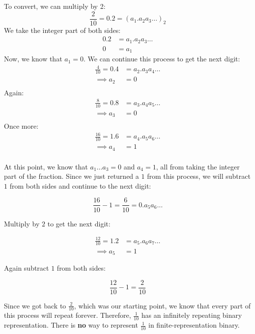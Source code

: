 To convert, we can multiply by 2:
\begin{equation*}
  \frac{2}{10} = 0.2 = (a_1 . a_2 a_3 \dots)_2
\end{equation*}
We take the integer part of both sides:
\begin{align*}
  0.2 &= a_1.a_2 a_3 \dots \\
  0 &= a_1
\end{align*}
Now, we know that $a_1 = 0$. We can continue this process to get the next
digit:
\begin{align*}
  \frac{4}{10} = 0.4 &= a_2.a_3 a_4 \dots \\
  \implies a_2 &= 0 \\
\end{align*}
Again:
\begin{align*}
  \frac{8}{10} = 0.8 &= a_3.a_4 a_5 \dots \\
  \implies a_3 &= 0 \\
\end{align*}
Once more:
\begin{align*}
  \frac{16}{10} = 1.6 &= a_4.a_5 a_6 \dots \\
  \implies a_4 &= 1 \\
\end{align*}

At this point, we know that $a_1 \dots a_3 = 0$ and $a_4 = 1$, all from taking
the integer part of the fraction. Since we just returned a $1$ from this process,
we will subtract $1$ from both sides and continue to the next digit:

\begin{equation*}
  \frac{16}{10} - 1 = \frac{6}{10} = 0.a_5 a_6 \dots
\end{equation*}

Multiply by $2$ to get the next digit:

\begin{align*}
  \frac{12}{10} = 1.2 &= a_5.a_6 a_7\dots \\
  \implies a_5 &= 1
\end{align*}

Again subtract $1$ from both sides:

\begin{equation*}
  \frac{12}{10} - 1 = \frac{2}{10} 
\end{equation*}

Since we got back to $\frac{2}{10}$, which was our starting point, we know that
every part of this process will repeat forever. Therefore, $\frac{1}{10}$ has
an infinitely repeating binary representation. There is \textbf{no} way to 
represent $\frac{1}{10}$ in finite-representation binary.

